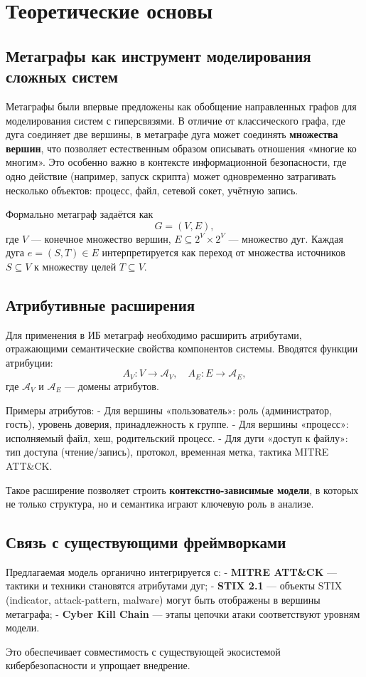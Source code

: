 \section{Теоретические основы}

\subsection{Метаграфы как инструмент моделирования сложных систем}

Метаграфы были впервые предложены как обобщение направленных графов для моделирования систем с гиперсвязями. В отличие от классического графа, где дуга соединяет две вершины, в метаграфе дуга может соединять \textbf{множества вершин}, что позволяет естественным образом описывать отношения «многие ко многим». Это особенно важно в контексте информационной безопасности, где одно действие (например, запуск скрипта) может одновременно затрагивать несколько объектов: процесс, файл, сетевой сокет, учётную запись.

Формально метаграф задаётся как  
\[
G = (V, E),
\]  
где \(V\) — конечное множество вершин, \(E \subseteq 2^V \times 2^V\) — множество дуг. Каждая дуга \(e = (S, T) \in E\) интерпретируется как переход от множества источников \(S \subseteq V\) к множеству целей \(T \subseteq V\).

\subsection{Атрибутивные расширения}

Для применения в ИБ метаграф необходимо расширить атрибутами, отражающими семантические свойства компонентов системы. Вводятся функции атрибуции:
\[
A_V: V \to \mathcal{A}_V, \quad A_E: E \to \mathcal{A}_E,
\]  
где \(\mathcal{A}_V\) и \(\mathcal{A}_E\) — домены атрибутов.

Примеры атрибутов:
- Для вершины «пользователь»: роль (администратор, гость), уровень доверия, принадлежность к группе.
- Для вершины «процесс»: исполняемый файл, хеш, родительский процесс.
- Для дуги «доступ к файлу»: тип доступа (чтение/запись), протокол, временная метка, тактика MITRE ATT\&CK.

Такое расширение позволяет строить \textbf{контекстно-зависимые модели}, в которых не только структура, но и семантика играют ключевую роль в анализе.

\subsection{Связь с существующими фреймворками}

Предлагаемая модель органично интегрируется с:
- \textbf{MITRE ATT\&CK} — тактики и техники становятся атрибутами дуг;
- \textbf{STIX 2.1} — объекты STIX (indicator, attack-pattern, malware) могут быть отображены в вершины метаграфа;
- \textbf{Cyber Kill Chain} — этапы цепочки атаки соответствуют уровням модели.

Это обеспечивает совместимость с существующей экосистемой кибербезопасности и упрощает внедрение.